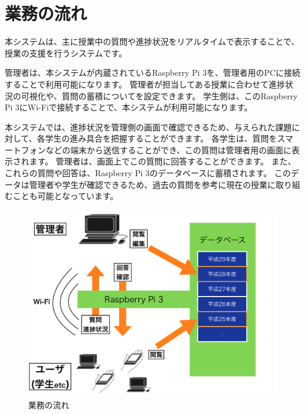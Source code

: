\section{業務の流れ}
本システムは、主に授業中の質問や進捗状況をリアルタイムで表示することで、授業の支援を行うシステムです。

管理者は、本システムが内蔵されているRaspberry Pi 3を、管理者用のPCに接続することで利用可能になります。
管理者が担当してある授業に合わせて進捗状況の可視化や、質問の蓄積についてを設定できます。
学生側は、このRaspberry Pi 3にWi-Fiで接続することで、本システムが利用可能になります。

本システムでは、進捗状況を管理側の画面で確認できるため、与えられた課題に対して、各学生の進み具合を把握することができます。
各学生は、質問をスマートフォンなどの端末から送信することができ、この質問は管理者用の画面に表示されます。
管理者は、画面上でこの質問に回答することができます。
また、これらの質問や回答は、Raspberry Pi 3のデータベースに蓄積されます。
このデータは管理者や学生が確認できるため、過去の質問を参考に現在の授業に取り組むことも可能となっています。

\begin{figure}[htbp]
  \begin{center}
    \includegraphics[width=1\linewidth,clip]{./img/flow.png}
    \caption{業務の流れ}\label{fig:flow}
  \end{center}
\end{figure}
